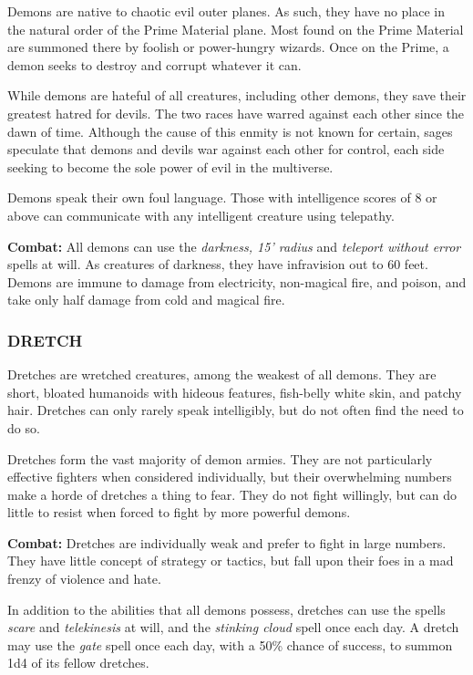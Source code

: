 \begin{multicols}{2}
Demons are native to chaotic evil outer planes. As such, they have no place in the natural order of the Prime Material plane. Most found on the Prime Material are summoned there by foolish or power-hungry wizards. Once on the Prime, a demon seeks to destroy and corrupt whatever it can.

While demons are hateful of all creatures, including other demons, they save their greatest hatred for devils. The two races have warred against each other since the dawn of time. Although the cause of this enmity is not known for certain, sages speculate that demons and devils war against each other for control, each side seeking to become the sole power of evil in the multiverse.

Demons speak their own foul language. Those with intelligence scores of 8 or above can communicate with any intelligent creature using telepathy.

\textbf{Combat:} All demons can use the \textit{darkness, 15' radius} and \textit{teleport without error} spells at will. As creatures of darkness, they have infravision out to 60 feet. Demons are immune to damage from electricity, non-magical fire, and poison, and take only half damage from cold and magical fire.

\subsubsection{DRETCH}

Dretches are wretched creatures, among the weakest of all demons. They are short, bloated humanoids with hideous features, fish-belly white skin, and patchy hair. Dretches can only rarely speak intelligibly, but do not often find the need to do so.

Dretches form the vast majority of demon armies. They are not particularly effective fighters when considered individually, but their overwhelming numbers make a horde of dretches a thing to fear. They do not fight willingly, but can do little to resist when forced to fight by more powerful demons.

\textbf{Combat:} Dretches are individually weak and prefer to fight in large numbers. They have little concept of strategy or tactics, but fall upon their foes in a mad frenzy of violence and hate.

In addition to the abilities that all demons possess, dretches can use the spells \textit{scare} and \textit{telekinesis} at will, and the \textit{stinking cloud} spell once each day. A dretch may use the \textit{gate} spell once each day, with a 50\% chance of success, to summon 1d4 of its fellow dretches. 


\end{multicols}
